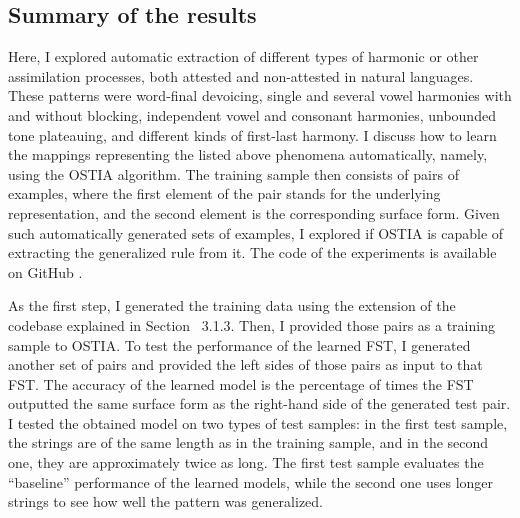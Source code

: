 \subsection{Summary of the results}

Here, I explored automatic extraction of different types of harmonic or other assimilation processes, both attested and non-attested in natural languages.
These patterns were word-final devoicing, single and several vowel harmonies with and without blocking, independent vowel and consonant harmonies, unbounded tone plateauing, and different kinds of first-last harmony.
I discuss how to learn the mappings representing the listed above phenomena automatically, namely, using the OSTIA algorithm.
The training sample then consists of pairs of examples, where the first element of the pair stands for the underlying representation, and the second element is the corresponding surface form.
Given such automatically generated sets of examples, I explored if OSTIA is capable of extracting the generalized rule from it.
The code of the experiments is available on GitHub \href{https://github.com/alenaks/subregular-experiments}{\faGithub} \citep{GHsubex}.


As the first step, I generated the training data using the extension of the codebase explained in Section~ 3.1.3.
Then, I provided those pairs as a training sample to OSTIA.
To test the performance of the learned FST, I generated another set of pairs and provided the left sides of those pairs as input to that FST.
The accuracy of the learned model is the percentage of times the FST outputted the same surface form as the right-hand side of the generated test pair.
I tested the obtained model on two types of test samples: in the first test sample, the strings are of the same length as in the training sample, and in the second one, they are approximately twice as long.
The first test sample evaluates the ``baseline'' performance of the learned models, while the second one uses longer strings to see how well the pattern was generalized.

